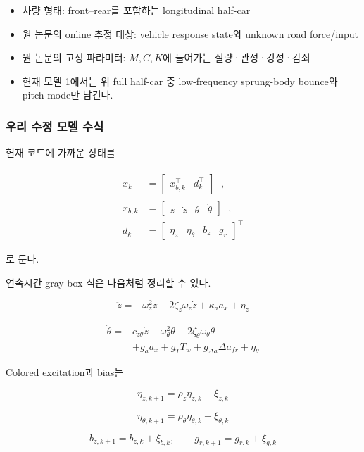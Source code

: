 \documentclass[letterpaper,10pt,journal,twocolumn]{ieeeconf}
\begin{document}
\begin{itemize}

\item
  차량 형태: front--rear를 포함하는 longitudinal half-car
\item
  원 논문의 online 추정 대상: vehicle response state와 unknown road force/input
\item
  원 논문의 고정 파라미터: \(M,C,K\)에 들어가는 질량·관성·강성·감쇠
\item
  현재 모델 1에서는 위 full half-car 중 low-frequency sprung-body bounce와 pitch mode만 남긴다.
\end{itemize}

\subsubsection{우리 수정 모델 수식}

현재 코드에 가까운 상태를

\[
\begin{aligned}
x_k
&=
\begin{bmatrix}
x_{b,k}^{\top}&d_k^{\top}
\end{bmatrix}^{\top},\\
x_{b,k}
&=
\begin{bmatrix}
z&\dot z&\theta&\dot\theta
\end{bmatrix}^{\top},\\
d_k
&=
\begin{bmatrix}
\eta_z&\eta_\theta&b_z&g_r
\end{bmatrix}^{\top}
\end{aligned}
\]

로 둔다.

연속시간 gray-box 식은 다음처럼 정리할 수 있다.

\[
\ddot z
=
-\omega_z^2z
-2\zeta_z\omega_z\dot z
+\kappa_a a_x
+\eta_z
\]

\[
\begin{aligned}
\ddot\theta
={}&
c_{z\theta}\dot z
-\omega_\theta^2\theta
-2\zeta_\theta\omega_\theta\dot\theta\\
&+g_a a_x
+g_TT_w
+g_{\Delta a}\Delta a_{fr}
+\eta_\theta
\end{aligned}
\]

Colored excitation과 bias는

\[
\eta_{z,k+1}
=
\rho_z\eta_{z,k}+\xi_{z,k}
\]

\[
\eta_{\theta,k+1}
=
\rho_\theta\eta_{\theta,k}+\xi_{\theta,k}
\]

\[
b_{z,k+1}=b_{z,k}+\xi_{b,k},
\qquad
g_{r,k+1}=g_{r,k}+\xi_{g,k}
\]
\end{document}
